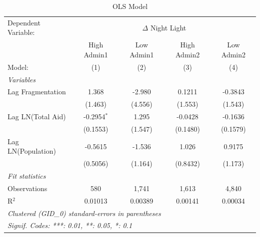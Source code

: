 \begin{table}[htbp]
\centering
\caption{OLS Model}
\label{tab:ols_results}
\begin{tabular}{lcccc}
   \tabularnewline \midrule \midrule
   Dependent Variable: & \multicolumn{4}{c}{$\Delta$ Night Light}\\
                      & High Admin1   & Low Admin1 & High Admin2 & Low Admin2 \\   
   Model:             & (1)           & (2)        & (3)         & (4)\\  
   \midrule
   \emph{Variables}\\
   Lag Fragmentation       & 1.368         & -2.980     & 0.1211      & -0.3843\\   
                      & (1.463)       & (4.556)    & (1.553)     & (1.543)\\   
   Lag LN(Total Aid)  & -0.2954$^{*}$ & 1.295      & -0.0428     & -0.1636\\   
                      & (0.1553)      & (1.547)    & (0.1480)    & (0.1579)\\   
   Lag LN(Population) & -0.5615       & -1.536     & 1.026       & 0.9175\\   
                      & (0.5056)      & (1.164)    & (0.8432)    & (1.173)\\   
   \midrule
   \emph{Fit statistics}\\
   Observations       & 580           & 1,741      & 1,613       & 4,840\\  
   R$^2$              & 0.01013       & 0.00389    & 0.00141     & 0.00034\\  
   \midrule \midrule
   \multicolumn{5}{l}{\emph{Clustered (GID\_0) standard-errors in parentheses}}\\
   \multicolumn{5}{l}{\emph{Signif. Codes: ***: 0.01, **: 0.05, *: 0.1}}\\
\end{tabular}
\end{table}


